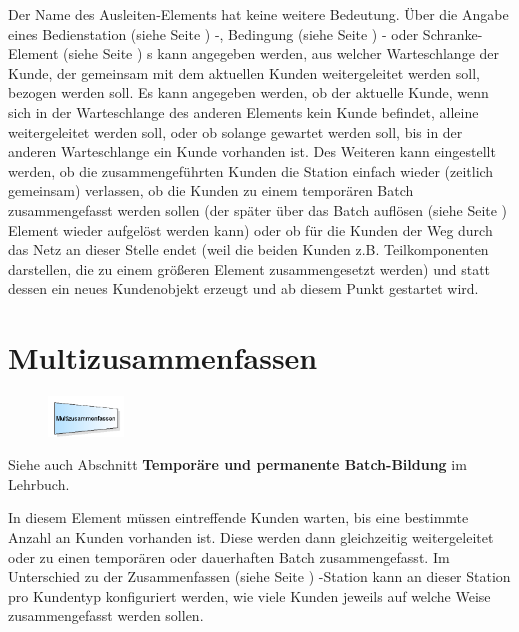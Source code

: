 Der Name des Ausleiten-Elements hat keine weitere Bedeutung. Über die Angabe eines 
Bedienstation (siehe Seite \pageref{ref:ModelElementProcess}) -, Bedingung (siehe Seite \pageref{ref:ModelElementHold}) -
oder Schranke-Element (siehe Seite \pageref{ref:ModelElementBarrier}) s kann angegeben werden, aus welcher Warteschlange
der Kunde, der gemeinsam mit dem aktuellen Kunden weitergeleitet werden soll, bezogen werden soll.
Es kann angegeben werden, ob der aktuelle Kunde, wenn sich in der Warteschlange des anderen Elements kein
Kunde befindet, alleine weitergeleitet werden soll, oder ob solange gewartet werden soll, bis in der
anderen Warteschlange ein Kunde vorhanden ist. Des Weiteren kann eingestellt werden,
ob die zusammengeführten Kunden die Station einfach wieder (zeitlich gemeinsam) verlassen, ob die Kunden zu einem temporären
Batch zusammengefasst werden sollen (der später über das Batch auflösen (siehe Seite \pageref{ref:ModelElementSeparate}) Element
wieder aufgelöst werden kann) oder ob für die Kunden der Weg durch
das Netz an dieser Stelle endet (weil die beiden Kunden z.B. Teilkomponenten darstellen, die zu einem größeren Element
zusammengesetzt werden) und statt dessen ein neues Kundenobjekt erzeugt und ab diesem Punkt gestartet wird. 


\section{Multizusammenfassen}
\label{ref:ModelElementBatchMulti}

\begin{figure}
\vspace{-22pt}
\includegraphics[width=2cm]{imageModelElementBatchMulti.png}
\vspace{-22pt}
\end{figure}

Siehe auch Abschnitt \textbf{Temporäre und permanente Batch-Bildung} im Lehrbuch.

In diesem Element müssen eintreffende Kunden warten, bis eine bestimmte Anzahl an Kunden vorhanden ist.
Diese werden dann gleichzeitig weitergeleitet oder zu einen temporären oder dauerhaften Batch zusammengefasst.
Im Unterschied zu der Zusammenfassen (siehe Seite \pageref{ref:ModelElementBatch}) -Station kann an dieser Station
pro Kundentyp konfiguriert werden, wie viele Kunden jeweils auf welche Weise zusammengefasst werden sollen.

